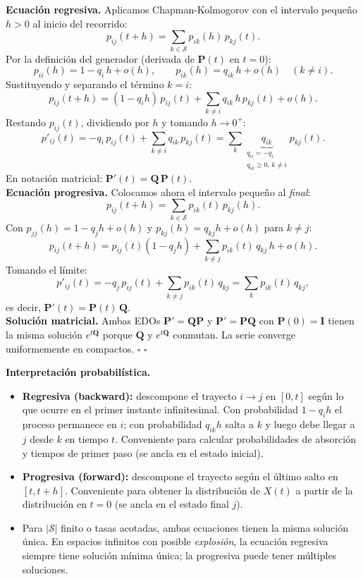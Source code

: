 \documentclass[10pt,a4paper]{article}
\numberwithin{equation}{section}
\newcommand{\Sset}{\mathcal{S}}                          %
\newcommand{\generator}{\mathbf{Q}}                      %
\newenvironment{nota}{\begin{tcolorbox}[notebox]}{\end{tcolorbox}}
\newenvironment{demostracion}{\begin{tcolorbox}[proofbox]}{\hfill$\square$\end{tcolorbox}}
\begin{document}
\begin{demostracion}
  \textbf{Ecuaci\'on regresiva.}
  Aplicamos Chapman-Kolmogorov con el intervalo pequeño $h>0$ al inicio del recorrido:
  \[
    p_{ij}(t+h) = \sum_{k \in \Sset} p_{ik}(h)\,p_{kj}(t).
  \]
  Por la definici\'on del generador (derivada de $\mathbf{P}(t)$ en $t=0$):
  \[
    p_{ii}(h) = 1 - q_i\,h + o(h), \qquad p_{ik}(h) = q_{ik}\,h + o(h)\quad (k\neq i).
  \]
  Sustituyendo y separando el t\'ermino $k=i$:
  \[
    p_{ij}(t+h) = (1 - q_i h)\,p_{ij}(t) + \sum_{k \neq i} q_{ik}\,h\,p_{kj}(t) + o(h).
  \]
  Restando $p_{ij}(t)$, dividiendo por $h$ y tomando $h \to 0^+$:
  \[
    p'_{ij}(t) = -q_i\,p_{ij}(t) + \sum_{k \neq i} q_{ik}\,p_{kj}(t)
              = \sum_{k} \underbrace{q_{ik}}_{\substack{q_{ii}=-q_i \\ q_{ik}\ge0,\,k\ne i}} p_{kj}(t).
  \]
  En notaci\'on matricial: $\mathbf{P}'(t) = \generator\,\mathbf{P}(t)$.\\[6pt]

  \textbf{Ecuaci\'on progresiva.}
  Colocamos ahora el intervalo peque\~no al \emph{final}:
  \[
    p_{ij}(t+h) = \sum_{k \in \Sset} p_{ik}(t)\,p_{kj}(h).
  \]
  Con $p_{jj}(h) = 1 - q_j h + o(h)$ y $p_{kj}(h) = q_{kj}h + o(h)$ para $k\neq j$:
  \[
    p_{ij}(t+h) = p_{ij}(t)(1 - q_j h) + \sum_{k \neq j} p_{ik}(t)\,q_{kj}\,h + o(h).
  \]
  Tomando el l\'imite:
  \[
    p'_{ij}(t) = -q_j\,p_{ij}(t) + \sum_{k \neq j} p_{ik}(t)\,q_{kj}
              = \sum_k p_{ik}(t)\,q_{kj},
  \]
  es decir, $\mathbf{P}'(t) = \mathbf{P}(t)\,\generator$.\\[6pt]

  \textbf{Soluci\'on matricial.}
  Ambas EDOs $\mathbf{P}'=\generator\mathbf{P}$ y $\mathbf{P}'=\mathbf{P}\generator$ con $\mathbf{P}(0)=\mathbf{I}$
  tienen la misma soluci\'on $e^{t\generator}$ porque $\generator$ y $e^{t\generator}$ conmutan.
  La serie converge uniformemente en compactos. $\square$
\end{demostracion}

\begin{nota}
  \textbf{Interpretaci\'on probabil\'istica.}
  \begin{itemize}
    \item \textbf{Regresiva (backward):} descompone el trayecto $i\to j$ en $[0,t]$ seg\'un lo que ocurre en el primer instante infinitesimal. Con probabilidad $1-q_i h$ el proceso permanece en $i$; con probabilidad $q_{ik}h$ salta a $k$ y luego debe llegar a $j$ desde $k$ en tiempo $t$. Conveniente para calcular probabilidades de absorci\'on y tiempos de primer paso (se ancla en el estado inicial).
    \item \textbf{Progresiva (forward):} descompone el trayecto seg\'un el \'ultimo salto en $[t,t+h]$. Conveniente para obtener la distribuci\'on de $X(t)$ a partir de la distribuci\'on en $t=0$ (se ancla en el estado final $j$).
    \item Para $|\Sset|$ finito o tasas acotadas, ambas ecuaciones tienen la misma soluci\'on \'unica. En espacios infinitos con posible \emph{explosi\'on}, la ecuaci\'on regresiva siempre tiene soluci\'on m\'inima \'unica; la progresiva puede tener m\'ultiples soluciones.
  \end{itemize}
\end{nota}
\end{document}
